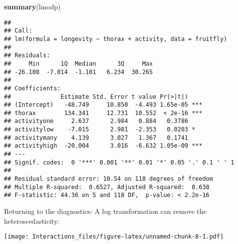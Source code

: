\documentclass[
]{article}
\newenvironment{Shaded}{\begin{snugshade}}{\end{snugshade}}
\newcommand{\DataTypeTok}[1]{\textcolor[rgb]{0.13,0.29,0.53}{#1}}
\newcommand{\DecValTok}[1]{\textcolor[rgb]{0.00,0.00,0.81}{#1}}
\newcommand{\KeywordTok}[1]{\textcolor[rgb]{0.13,0.29,0.53}{\textbf{#1}}}
\newcommand{\NormalTok}[1]{#1}
\newcommand{\OperatorTok}[1]{\textcolor[rgb]{0.81,0.36,0.00}{\textbf{#1}}}
\newcommand{\StringTok}[1]{\textcolor[rgb]{0.31,0.60,0.02}{#1}}
\begin{document}
\begin{Shaded}
\begin{Highlighting}[]
\KeywordTok{summary}\NormalTok{(lmodp)}
\end{Highlighting}
\end{Shaded}

\begin{verbatim}
## 
## Call:
## lm(formula = longevity ~ thorax + activity, data = fruitfly)
## 
## Residuals:
##     Min      1Q  Median      3Q     Max 
## -26.108  -7.014  -1.101   6.234  30.265 
## 
## Coefficients:
##              Estimate Std. Error t value Pr(>|t|)    
## (Intercept)   -48.749     10.850  -4.493 1.65e-05 ***
## thorax        134.341     12.731  10.552  < 2e-16 ***
## activityone     2.637      2.984   0.884   0.3786    
## activitylow    -7.015      2.981  -2.353   0.0203 *  
## activitymany    4.139      3.027   1.367   0.1741    
## activityhigh  -20.004      3.016  -6.632 1.05e-09 ***
## ---
## Signif. codes:  0 '***' 0.001 '**' 0.01 '*' 0.05 '.' 0.1 ' ' 1
## 
## Residual standard error: 10.54 on 118 degrees of freedom
## Multiple R-squared:  0.6527, Adjusted R-squared:  0.638 
## F-statistic: 44.36 on 5 and 118 DF,  p-value: < 2.2e-16
\end{verbatim}

Returning to the diagnostics: A log transformation can remove the
heteroscedasticity:

\begin{Shaded}
\end{Shaded}

\texttt{[image: Interactions\_files/figure-latex/unnamed-chunk-8-1.pdf]}

\begin{Shaded}
\end{Shaded}
\end{document}
